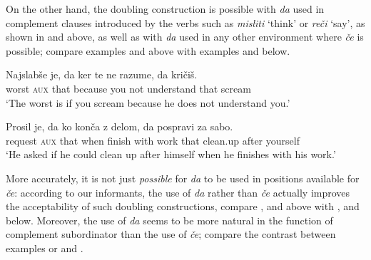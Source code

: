 \documentclass[output=paper,
]{langscibook}
\begin{document}
\begin{exe} 
\end{exe}

\noindent On the other hand, the doubling construction is possible with \textit{da} used in complement clauses introduced by the verbs such as \textit{misliti} `think' or \textit{reči} `say', as shown in  and  above, as well as with \textit{da} used in any other environment where \textit{če} is possible; compare examples  and  above with examples  and  below. 

\begin{exe} 
\ex \label{ex:plesnicar:nineteen}
\gll Najslabše	je, 	da 	ker 		te	ne 	razume, 	da 	kričiš.\\
 worst		\textsc{aux}	that	because	you	not	understand	that     scream \\
\trans `The worst is if you scream because he does not understand you.' 
\end{exe}

\begin{exe} 
\ex \label{ex:plesnicar:twenty}
\gll Prosil 		je, 	da 	ko 	konča	 z 	delom, da 	pospravi za 	sabo.\\	
request		\textsc{aux}	that	when	finish	with	work	that 	clean.up after	yourself \\
\trans `He asked if he could clean up after himself when he finishes with his work.' 
\end{exe}

\noindent More accurately, it is not just \textit{possible} for \textit{da} to be used in positions available for \textit{če}: according to our informants, the use of \textit{da} rather than \textit{če} actually improves the acceptability of such doubling constructions, compare ,  and  above with ,  and  below. Moreover, the use of \textit{da} seems to be more natural in the function of complement subordinator than the use of \textit{če}; compare the contrast between examples  or  and .
\end{document}
